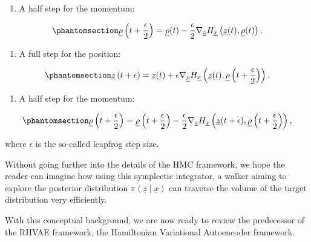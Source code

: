 \documentclass[
]{scrartcl}
\providecommand{\tightlist}{%
  \setlength{\itemsep}{0pt}\setlength{\parskip}{0pt}}\usepackage{longtable,booktabs,array}
\begin{document}
\begin{refsection}
\begin{enumerate}
\def\labelenumi{\arabic{enumi}.}
\tightlist
\item
  A half step for the momentum:
\end{enumerate}

\begin{equation}\phantomsection\label{eq-leapfrog-half-step}{
\underline{\rho}\left(t + \frac{\epsilon}{2}\right) = 
\underline{\rho}(t) - 
\frac{\epsilon}{2} \nabla_{\underline{z}} H_{\underline{x}}\left(
    \underline{z}(t), \underline{\rho}(t)
\right).
}\end{equation}

\begin{enumerate}
\def\labelenumi{\arabic{enumi}.}
\setcounter{enumi}{1}
\tightlist
\item
  A full step for the position:
\end{enumerate}

\begin{equation}\phantomsection\label{eq-leapfrog-full-step}{
\underline{z}\left(t + \epsilon\right) = 
\underline{z}(t) + 
\epsilon \nabla_{\underline{\rho}} H_{\underline{x}}\left(
    \underline{z}(t), \underline{\rho}\left(t + \frac{\epsilon}{2}\right)
\right).
}\end{equation}

\begin{enumerate}
\def\labelenumi{\arabic{enumi}.}
\setcounter{enumi}{2}
\tightlist
\item
  A half step for the momentum:
\end{enumerate}

\begin{equation}\phantomsection\label{eq-leapfrog-half-step-2}{
\underline{\rho}\left(t + \frac{\epsilon}{2}\right) = 
\underline{\rho}\left(t + \frac{\epsilon}{2}\right) - 
\frac{\epsilon}{2} \nabla_{\underline{z}} H_{\underline{x}}\left(
    \underline{z}(t + \epsilon), \underline{\rho}\left(t + \frac{\epsilon}{2}\right)
\right),
}\end{equation}

where \(\epsilon\) is the so-called leapfrog step size.

Without going further into the details of the HMC framework, we hope the
reader can imagine how using this symplectic integrator, a walker aiming
to explore the posterior distribution
\(π(\underline{z} \mid \underline{x})\) can traverse the volume of the
target distribution very efficiently.

With this conceptual background, we are now ready to review the
predecessor of the RHVAE framework, the Hamiltonian Variational
Autoencoder framework.


\end{refsection}
\end{document}

